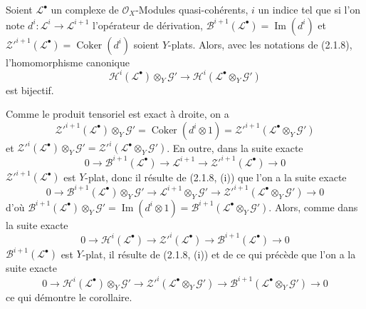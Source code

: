 \begin{corollary}[2.1.9]
\label{IV.2.1.9-fr}
Soient $\mathscr L^\bullet$ un complexe de $\mathcal O_X$-Modules
quasi-cohérents, $i$ un indice tel que si l'on note
$d^i:\mathscr L^i\to\mathscr L^{i+1}$ l'opérateur de dérivation,
$\mathscr B^{i+1}(\mathscr L^\bullet)=\operatorname{Im}(d^i)$ et
$\mathscr Z'^{i+1}(\mathscr L^\bullet)=\operatorname{Coker}(d^i)$ soient
$Y$-plats. Alors, avec les notations de \textup{(2.1.8)}, l'homomorphisme canonique
\[
\mathscr H^i(\mathscr L^\bullet)\otimes_Y\mathscr G'
\longrightarrow
\mathscr H^i(\mathscr L^\bullet\otimes_Y\mathscr G')
\]
est bijectif.
\end{corollary}

Comme le produit tensoriel est exact à droite, on a
\[
\mathscr Z'^{i+1}(\mathscr L^\bullet)\otimes_Y\mathscr G'
=\operatorname{Coker}(d^i\otimes1)
=\mathscr Z'^{i+1}(\mathscr L^\bullet\otimes_Y\mathscr G')
\]
et
$\mathscr Z'^i(\mathscr L^\bullet)\otimes_Y\mathscr G'
=\mathscr Z'^i(\mathscr L^\bullet\otimes_Y\mathscr G')$. En outre, dans la
suite exacte
\[
0\to\mathscr B^{i+1}(\mathscr L^\bullet)\to\mathscr L^{i+1}
\to\mathscr Z'^{i+1}(\mathscr L^\bullet)\to0
\]
$\mathscr Z'^{i+1}(\mathscr L^\bullet)$ est $Y$-plat, donc il résulte de
(2.1.8, (i)) que l'on a la suite exacte
\[
0\to\mathscr B^{i+1}(\mathscr L^\bullet)\otimes_Y\mathscr G'
\to\mathscr L^{i+1}\otimes_Y\mathscr G'
\to\mathscr Z'^{i+1}(\mathscr L^\bullet\otimes_Y\mathscr G')\to0
\]
d'où
$\mathscr B^{i+1}(\mathscr L^\bullet)\otimes_Y\mathscr G'
=\operatorname{Im}(d^i\otimes1)
=\mathscr B^{i+1}(\mathscr L^\bullet\otimes_Y\mathscr G')$. Alors, comme
dans la suite exacte
\[
0\to\mathscr H^i(\mathscr L^\bullet)\to\mathscr Z'^i(\mathscr L^\bullet)
\to\mathscr B^{i+1}(\mathscr L^\bullet)\to0
\]
$\mathscr B^{i+1}(\mathscr L^\bullet)$ est $Y$-plat, il résulte de
(2.1.8, (i)) et de ce qui précède que l'on a la suite exacte
\[
0\to\mathscr H^i(\mathscr L^\bullet)\otimes_Y\mathscr G'
\to\mathscr Z'^i(\mathscr L^\bullet\otimes_Y\mathscr G')
\to\mathscr B^{i+1}(\mathscr L^\bullet\otimes_Y\mathscr G')\to0
\]
ce qui démontre le corollaire.

